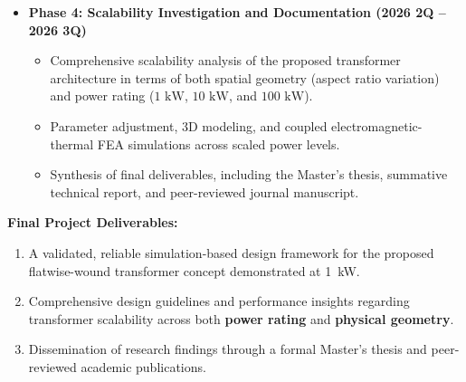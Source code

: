 \begin{itemize}
    \item \textbf{Phase 4: Scalability Investigation and Documentation (2026 2Q -- 2026 3Q)}
    \begin{itemize}
        \item Comprehensive scalability analysis of the proposed transformer architecture in terms of both spatial geometry (aspect ratio variation) and power rating ($1\text{ kW}$, $10\text{ kW}$, and $100\text{ kW}$).
        \item Parameter adjustment, 3D modeling, and coupled electromagnetic-thermal FEA simulations across scaled power levels.
        \item Synthesis of final deliverables, including the Master's thesis, summative technical report, and peer-reviewed journal manuscript.
    \end{itemize}
\end{itemize}

\textbf{Final Project Deliverables:}
\begin{enumerate}
    \item A validated, reliable simulation-based design framework for the proposed flatwise-wound transformer concept demonstrated at 1~kW.
    \item Comprehensive design guidelines and performance insights regarding transformer scalability across both \textbf{power rating} and \textbf{physical geometry}.
    \item Dissemination of research findings through a formal Master's thesis and peer-reviewed academic publications.
\end{enumerate}

